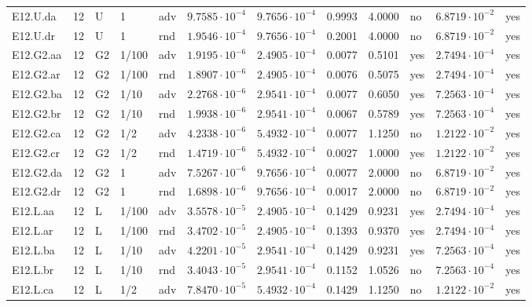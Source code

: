 {\begin{longtable}{@{}lllllllllll l@{}}
E12.U.da & 12 & U & 1 & adv & $9.7585\cdot 10^{-4}$ & $9.7656\cdot 10^{-4}$ & 0.9993 & 4.0000 & no & $6.8719\cdot 10^{-2}$ & yes \\
E12.U.dr & 12 & U & 1 & rnd & $1.9546\cdot 10^{-4}$ & $9.7656\cdot 10^{-4}$ & 0.2001 & 4.0000 & no & $6.8719\cdot 10^{-2}$ & yes \\
E12.G2.aa & 12 & G2 & 1/100 & adv & $1.9195\cdot 10^{-6}$ & $2.4905\cdot 10^{-4}$ & 0.0077 & 0.5101 & yes & $2.7494\cdot 10^{-4}$ & yes \\
E12.G2.ar & 12 & G2 & 1/100 & rnd & $1.8907\cdot 10^{-6}$ & $2.4905\cdot 10^{-4}$ & 0.0076 & 0.5075 & yes & $2.7494\cdot 10^{-4}$ & yes \\
E12.G2.ba & 12 & G2 & 1/10 & adv & $2.2768\cdot 10^{-6}$ & $2.9541\cdot 10^{-4}$ & 0.0077 & 0.6050 & yes & $7.2563\cdot 10^{-4}$ & yes \\
E12.G2.br & 12 & G2 & 1/10 & rnd & $1.9938\cdot 10^{-6}$ & $2.9541\cdot 10^{-4}$ & 0.0067 & 0.5789 & yes & $7.2563\cdot 10^{-4}$ & yes \\
E12.G2.ca & 12 & G2 & 1/2 & adv & $4.2338\cdot 10^{-6}$ & $5.4932\cdot 10^{-4}$ & 0.0077 & 1.1250 & no & $1.2122\cdot 10^{-2}$ & yes \\
E12.G2.cr & 12 & G2 & 1/2 & rnd & $1.4719\cdot 10^{-6}$ & $5.4932\cdot 10^{-4}$ & 0.0027 & 1.0000 & yes & $1.2122\cdot 10^{-2}$ & yes \\
E12.G2.da & 12 & G2 & 1 & adv & $7.5267\cdot 10^{-6}$ & $9.7656\cdot 10^{-4}$ & 0.0077 & 2.0000 & no & $6.8719\cdot 10^{-2}$ & yes \\
E12.G2.dr & 12 & G2 & 1 & rnd & $1.6898\cdot 10^{-6}$ & $9.7656\cdot 10^{-4}$ & 0.0017 & 2.0000 & no & $6.8719\cdot 10^{-2}$ & yes \\
E12.L.aa & 12 & L & 1/100 & adv & $3.5578\cdot 10^{-5}$ & $2.4905\cdot 10^{-4}$ & 0.1429 & 0.9231 & yes & $2.7494\cdot 10^{-4}$ & yes \\
E12.L.ar & 12 & L & 1/100 & rnd & $3.4702\cdot 10^{-5}$ & $2.4905\cdot 10^{-4}$ & 0.1393 & 0.9370 & yes & $2.7494\cdot 10^{-4}$ & yes \\
E12.L.ba & 12 & L & 1/10 & adv & $4.2201\cdot 10^{-5}$ & $2.9541\cdot 10^{-4}$ & 0.1429 & 0.9231 & yes & $7.2563\cdot 10^{-4}$ & yes \\
E12.L.br & 12 & L & 1/10 & rnd & $3.4043\cdot 10^{-5}$ & $2.9541\cdot 10^{-4}$ & 0.1152 & 1.0526 & no & $7.2563\cdot 10^{-4}$ & yes \\
E12.L.ca & 12 & L & 1/2 & adv & $7.8470\cdot 10^{-5}$ & $5.4932\cdot 10^{-4}$ & 0.1429 & 1.1250 & no & $1.2122\cdot 10^{-2}$ & yes \\

\end{longtable}}
